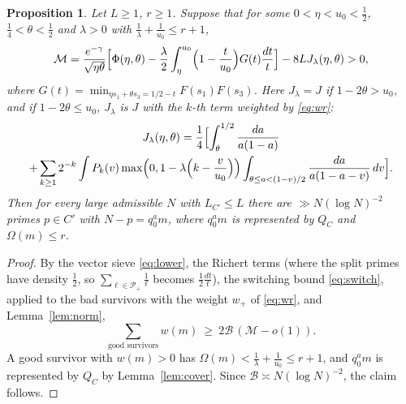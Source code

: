 \documentclass[11pt]{amsart}
\newtheorem{proposition}[theorem]{Proposition}
\theoremstyle{remark}
\newcommand{\cP}{\mathcal P}
\begin{document}
\begin{proposition}\label{prop:crit}
Let $L\ge1$, $r\ge1$. Suppose that for some $0<\eta<u_0<\frac12$, $\frac14<\theta<\frac12$ and $\lambda>0$ with $\frac1\lambda+\frac1{u_0}\le r+1$,
\[
\mathcal M=\frac{e^{-\gamma}}{\sqrt{\eta\theta}}\Bigl[\Phi(\eta,\theta)-\frac\lambda2\int_\eta^{u_0}\Bigl(1-\frac t{u_0}\Bigr)G(t)\frac{dt}t\Bigr]-8LJ_\lambda(\eta,\theta)>0,
\]
where $G(t)=\min_{\eta s_1+\theta s_3=1/2-t}F(s_1)F(s_3)$. Here $J_\lambda=J$ if $1-2\theta>u_0$, and if $1-2\theta\le u_0$, $J_\lambda$ is $J$ with the $k$-th term weighted by \eqref{eq:wr}:
\begin{multline*}
J_\lambda(\eta,\theta)=\frac14\Bigl[\int_\theta^{1/2}\frac{da}{a(1-a)}\\
+\sum_{k\ge1}2^{-k}\int P_k(v)\max\Bigl(0,1-\lambda\Bigl(k-\frac v{u_0}\Bigr)\Bigr)\int_{\theta\le a<(1-v)/2}\frac{da}{a(1-a-v)}\,dv\Bigr].
\end{multline*}
Then for every large admissible $N$ with $L_{C'}\le L$ there are $\gg N(\log N)^{-2}$ primes $p\in C'$ with $N-p=q_0^am$, where $q_0^am$ is represented by $Q_C$ and $\Omega(m)\le r$.
\end{proposition}
\begin{proof}
By the vector sieve \eqref{eq:lower}, the Richert terms (where the split primes have density $\frac12$, so $\sum_{\ell\in\cP_+}\frac1\ell$ becomes $\frac12\frac{dt}t$), the switching bound \eqref{eq:switch}, applied to the bad survivors with the weight $w_+$ of \eqref{eq:wr}, and Lemma~\ref{lem:norm},
\[
\sum_{\text{good survivors}}w(m)\ \ge\ 2\mathcal B\,(\mathcal M-o(1)) .
\]
A good survivor with $w(m)>0$ has $\Omega(m)<\frac1\lambda+\frac1{u_0}\le r+1$, and $q_0^am$ is represented by $Q_C$ by Lemma~\ref{lem:cover}. Since $\mathcal B\asymp N(\log N)^{-2}$, the claim follows.
\end{proof}
\end{document}
